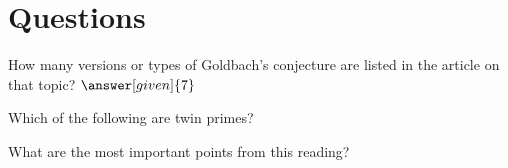 \documentclass[nooutcomes]{ximera}
\begin{document}
\section{Questions}

\begin{question}
How many versions or types of Goldbach's conjecture are listed in the article on that topic?
$\answer[given]{7}$
\end{question}

\begin{question}
Which of the following are twin primes?
\begin{multipleChoice}
\end{multipleChoice}
\end{question}


\begin{question}
What are the most important points from this reading?
\begin{freeResponse}
\end{freeResponse}

\end{question}
\end{document}
